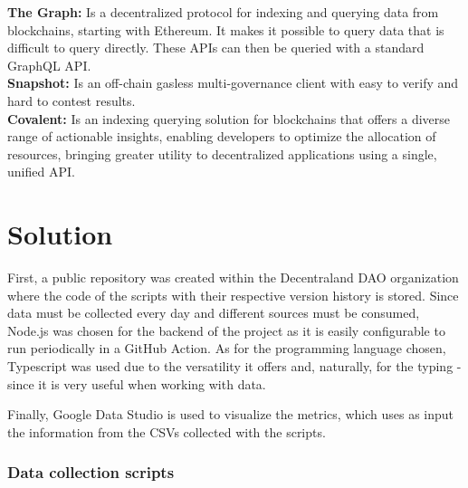 \documentclass[MSE,Master,english]{twbook}%
\begin{document}
\textbf{The Graph:} Is a decentralized protocol for indexing and querying data from blockchains, starting with Ethereum. It makes it possible to query data that is difficult to query directly. These APIs can then be queried with a standard GraphQL API. \\

\textbf{Snapshot:} Is an off-chain gasless multi-governance client with easy to verify and hard to contest results. \\

\textbf{Covalent:} Is an indexing querying solution for blockchains that offers a diverse range of actionable insights, enabling developers to optimize the allocation of resources, bringing greater utility to decentralized applications using a single, unified API.

\section{Solution}

First, a public repository was created within the Decentraland DAO organization where the code of the scripts with their respective version history is stored. Since data must be collected every day and different sources must be consumed, Node.js was chosen for the backend of the project as it is easily configurable to run periodically in a GitHub Action. As for the programming language chosen, Typescript was used due to the versatility it offers and, naturally, for the typing - since it is very useful when working with data.

Finally, Google Data Studio is used to visualize the metrics, which uses as input the information from the CSVs collected with the scripts.

\subsubsection{Data collection scripts}
\end{document}
